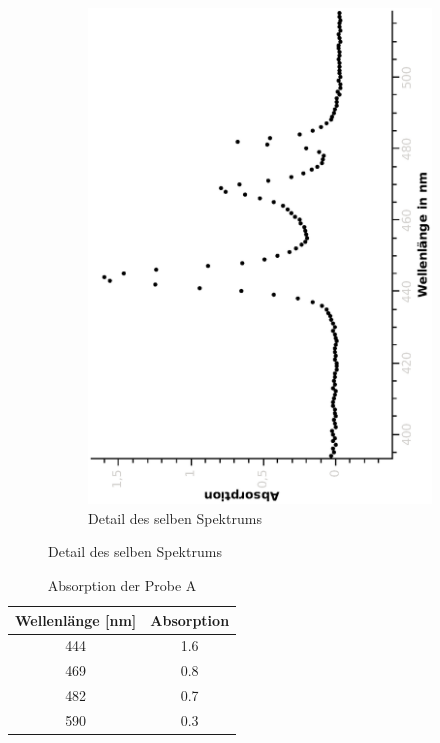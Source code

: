 \documentclass{article}
\begin{document}
\begin{figure}[H]
\begin{subfigure}[h]{0.4\textwidth}
\includegraphics[width=\textwidth ,angle=-90]{eps/probeAabsdetail.eps}
\caption{Detail des selben Spektrums}
\end{subfigure}
\end{figure}

\begin{table}[H]
\centering
\caption{Absorption der Probe A}
\label{AbsProbeA}
\begin{tabular}{|c|c|} \hline
Wellenlänge [nm] & Absorption  \\ 
\hline 444 & 1.6 \\
469 & 0.8 \\
482 & 0.7 \\
590 & 0.3 \\
\hline
\end{tabular}
\end{table}
\end{document}

